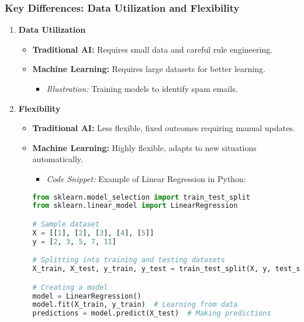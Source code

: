 \documentclass[aspectratio=169]{beamer}
\begin{document}
\begin{frame}[fragile]
    \frametitle{Key Differences: Data Utilization and Flexibility}
    \begin{enumerate}
        \item \textbf{Data Utilization}
            \begin{itemize}
                \item \textbf{Traditional AI:} Requires small data and careful rule engineering.
                \item \textbf{Machine Learning:} Requires large datasets for better learning.
                    \begin{itemize}
                        \item \textit{Illustration:} Training models to identify spam emails.
                    \end{itemize}
            \end{itemize}
        
        \item \textbf{Flexibility}
            \begin{itemize}
                \item \textbf{Traditional AI:} Less flexible, fixed outcomes requiring manual updates.
                \item \textbf{Machine Learning:} Highly flexible, adapts to new situations automatically.
                    \begin{itemize}
                        \item \textit{Code Snippet:} Example of Linear Regression in Python:
                        \end{itemize}
                        \begin{lstlisting}[language=Python]
from sklearn.model_selection import train_test_split
from sklearn.linear_model import LinearRegression

# Sample dataset
X = [[1], [2], [3], [4], [5]]
y = [2, 3, 5, 7, 11]

# Splitting into training and testing datasets
X_train, X_test, y_train, y_test = train_test_split(X, y, test_size=0.2)

# Creating a model
model = LinearRegression()
model.fit(X_train, y_train)  # Learning from data
predictions = model.predict(X_test)  # Making predictions
                        \end{lstlisting}
            \end{itemize}
    \end{enumerate}
\end{frame}
\end{document}
